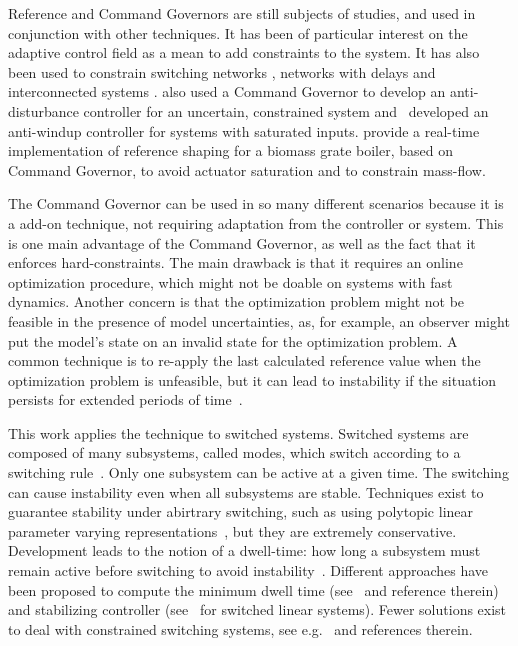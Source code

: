 Reference and Command Governors are still subjects of studies, and used in
conjunction with other techniques. It has been of particular interest on the
adaptive control field
\parencite{arabi.yucelen.ea:command,ristevski.dogan.ea:transient,wilcher.jaramillo.ea:on,dogan.yucelen.ea:improving,gruenwald.yucelen.ea:expanded,makavita.jayasinghe.ea:experimental}
as a mean to add constraints to the system. It has also been used to constrain
switching networks \parencite{ong.djamari.ea:governor}, networks with delays
\parencite{shen.song.ea:constrained} and interconnected systems
\parencite{tedesco.casavola:turn-based}. \textcite{peng.wang.ea:constrained}
also used a Command Governor to develop an anti-disturbance controller for an
uncertain, constrained system
and~\textcite{schwerdtner.bortoff.ea:projection-based} developed an anti-windup
controller for systems with saturated inputs.
\textcite{seeber.golles.ea:reference} provide a real-time implementation of
reference shaping for a biomass grate boiler, based on Command Governor, to
avoid actuator saturation and to constrain mass-flow.

The Command Governor can be used in so many different scenarios because it is a
add-on technique, not requiring adaptation from the controller or system. This
is one main advantage of the Command Governor, as well as the fact that it
enforces hard-constraints. The main drawback is that it requires an online
optimization procedure, which might not be doable on systems with fast dynamics.
Another concern is that the optimization problem might not be feasible in the
presence of model uncertainties, as, for example, an observer might put the
model's state on an invalid state for the optimization problem. A common
technique is to re-apply the last calculated reference value when the
optimization problem is unfeasible, but it can lead to instability if the
situation persists for extended periods of
time~\parencite{garone.di-cairano.ea:reference}.

This work applies the \CG{} technique to switched systems. Switched systems are
composed of many subsystems, called modes, which switch according to a switching
rule~\parencite{liberzon:switching,liberzon.morse:basic}. Only one subsystem can
be active at a given time. The switching can cause instability even when all
subsystems are stable. Techniques exist to guarantee stability under abirtrary
switching, such as using polytopic linear parameter varying
representations~\parencite{deaecto.geromel.ea:robust}, but they are extremely
conservative. Development leads to the notion of a dwell-time: how long a
subsystem must remain active before switching to avoid
instability~\parencite{liberzon.morse:basic}. Different approaches have been
proposed to compute the minimum dwell time
(see~\parencite{chesi.colaneri.ea:computing} and reference therein) and
stabilizing controller (see~\parencite{lin.antsaklis:stability} for switched
linear systems). Fewer solutions exist to deal with constrained switching
systems, see e.g.~\parencite{franzè.lucia.ea:command,lucia.franzè:stabilization}
and references therein.


